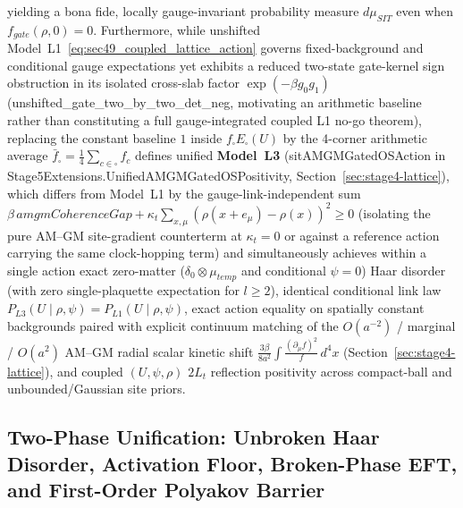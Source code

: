 \documentclass[american,11pt,letterpaper]{article}
\def\mathrm#1{#1}%
\def\texttt#1{#1}%
\begin{document}
yielding a bona fide, locally gauge-invariant probability measure $d\mu_{\mathrm{SIT}}$ even when $f_{\mathrm{gate}}(\rho, 0) = 0$. Furthermore, while unshifted Model~L1~\eqref{eq:sec49_coupled_lattice_action} governs fixed-background and conditional gauge expectations yet exhibits a reduced two-state gate-kernel sign obstruction in its isolated cross-slab factor $\exp(-\beta g_0 g_1)$ (\texttt{unshifted\_\allowbreak{}gate\_\allowbreak{}two\_\allowbreak{}by\_\allowbreak{}two\_\allowbreak{}det\_\allowbreak{}neg}, motivating an arithmetic baseline rather than constituting a full gauge-integrated coupled L1 no-go theorem), replacing the constant baseline $1$ inside $f_\square E_\square(U)$ by the 4-corner arithmetic average $\bar{f}_\square = \frac{1}{4}\sum_{c\in\square} f_c$ defines unified \textbf{Model~L3} (\texttt{sitAMGMGatedOSAction} in \texttt{Stage5\allowbreak{}Extensions.\allowbreak{}Unified\allowbreak{}AMGMGated\allowbreak{}OSPositivity}, Section~\ref{sec:stage4-lattice}), which differs from Model~L1 by the gauge-link-independent sum $\beta\,\mathrm{amgmCoherenceGap} + \kappa_t\sum_{x,\mu}(\rho(x+e_\mu)-\rho(x))^2 \ge 0$ (isolating the pure AM--GM site-gradient counterterm at $\kappa_t = 0$ or against a reference action carrying the same clock-hopping term) and simultaneously achieves within a single action exact zero-matter ($\delta_0 \otimes \mu_{\mathrm{temp}}$ and conditional $\psi = 0$) Haar disorder (with zero single-plaquette expectation for $l \ge 2$), identical conditional link law $P_{\mathrm{L3}}(U\mid\rho,\psi) = P_{\mathrm{L1}}(U\mid\rho,\psi)$, exact action equality on spatially constant backgrounds paired with explicit continuum matching of the $O(a^{-2})$ / marginal / $O(a^2)$ AM--GM radial scalar kinetic shift $\frac{3\beta}{8a^2}\int \frac{(\partial_\mu f)^2}{f}\,d^4x$ (Section~\ref{sec:stage4-lattice}), and coupled $(U,\psi,\rho)$ $2L_t$ reflection positivity across compact-ball and unbounded/Gaussian site priors.

\subsection{Two-Phase Unification: Unbroken Haar Disorder, Activation Floor, Broken-Phase EFT, and First-Order Polyakov Barrier}
\end{document}
